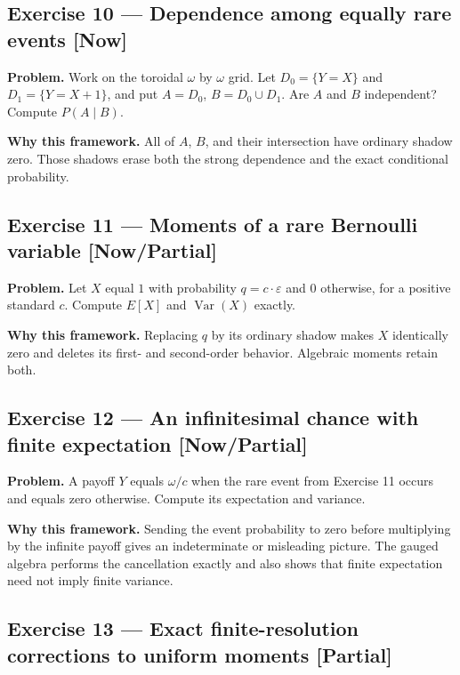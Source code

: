 \documentclass[11pt]{article}
\newcommand{\eps}{\varepsilon}
\newcommand{\Var}{\operatorname{Var}}
\begin{document}
\subsection*{Exercise 10 --- Dependence among equally rare events \hfill \normalfont\small[Now]}

\textbf{Problem.} Work on the toroidal $\omega$ by $\omega$ grid. Let
$D_{0} = \{Y=X\}$ and $D_{1} = \{Y=X+1\}$, and put $A=D_{0}$, $B=D_{0}\cup D_{1}$. Are $A$ and
$B$ independent? Compute $P(A\mid B)$.

\textbf{Why this framework.} All of $A$, $B$, and their intersection have ordinary
shadow zero. Those shadows erase both the strong dependence and the exact
conditional probability.


\subsection*{Exercise 11 --- Moments of a rare Bernoulli variable \hfill \normalfont\small[Now/Partial]}

\textbf{Problem.} Let $X$ equal $1$ with probability $q=c\cdot \eps$ and $0$
otherwise, for a positive standard $c$. Compute $E[X]$ and $\Var(X)$ exactly.

\textbf{Why this framework.} Replacing $q$ by its ordinary shadow makes $X$
identically zero and deletes its first- and second-order behavior. Algebraic
moments retain both.


\subsection*{Exercise 12 --- An infinitesimal chance with finite expectation \hfill \normalfont\small[Now/Partial]}

\textbf{Problem.} A payoff $Y$ equals $\omega/c$ when the rare event from Exercise 11
occurs and equals zero otherwise. Compute its expectation and variance.

\textbf{Why this framework.} Sending the event probability to zero before
multiplying by the infinite payoff gives an indeterminate or misleading
picture. The gauged algebra performs the cancellation exactly and also shows
that finite expectation need not imply finite variance.


\subsection*{Exercise 13 --- Exact finite-resolution corrections to uniform moments \hfill \normalfont\small[Partial]}
\end{document}

